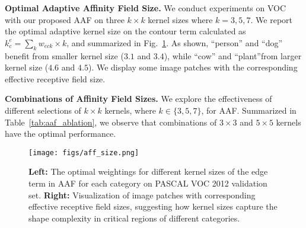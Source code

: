 \noindent
\textbf{Optimal Adaptive Affinity Field Size.}
We conduct experiments on VOC with our proposed AAF on three $k \times k$ kernel sizes where $k=3,5,7$. We report the optimal adaptive kernel size on the contour term calculated as $k^{e}_c=\sum_{k} w_{eck} \times k$, and summarized in Fig.~\ref{fig:aff_size}. As shown, ``person'' and ``dog'' benefit from smaller kernel size ($3.1$ and $3.4$), while ``cow'' and ``plant''from larger kernel size ($4.6$ and $4.5$). We display some image patches with the corresponding effective receptive field size.

\noindent
\textbf{Combinations of Affinity Field Sizes.}
We explore the effectiveness of different selections of $k \times k$ kernels, where $k \in \{3,5,7\}$, for AAF. Summarized in Table~\ref{tab:aaf_ablation}, we observe that combinations of $3 \times 3$ and $5 \times 5$ kernels have the optimal performance. 

\begin{figure}[t]
    \centering
    \texttt{[image: figs/aff\_size.png]}
    \caption{{\bf Left:} The optimal weightings for different kernel sizes of the edge term in AAF for each category on PASCAL VOC 2012 validation set.  {\bf Right:} Visualization of image patches with corresponding effective receptive field sizes, suggesting how kernel sizes capture the shape complexity in critical regions of different categories.}
    \label{fig:aff_size}
\end{figure}

\begin{table*}[t]
  \centering
    \vspace{0.5pt}
    \caption{Per-category IOU results of AAF with different combinations of kernel sizes $k$ on VOC 2012 validation set. `$\checkmark$' denotes the inclusion of respective kernel size as opposed to `$\times$'.}
    \label{tab:aaf_ablation}
\end{table*}

